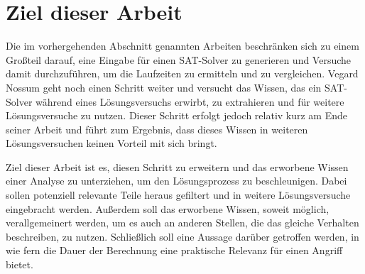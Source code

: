 \section{Ziel dieser Arbeit}
\label{sec:ziel}

Die im vorhergehenden Abschnitt genannten Arbeiten beschränken sich zu einem Großteil darauf, eine Eingabe für
einen SAT-Solver zu generieren und Versuche damit durchzuführen, um die Laufzeiten zu ermitteln und zu vergleichen.
Vegard Nossum geht noch einen Schritt weiter und versucht das Wissen, das ein SAT-Solver während eines Lösungsversuchs
erwirbt, zu extrahieren und für weitere Lösungsversuche zu nutzen. Dieser Schritt erfolgt jedoch relativ kurz am Ende
seiner Arbeit und führt zum Ergebnis, dass dieses Wissen in weiteren Lösungsversuchen keinen Vorteil mit sich bringt.

Ziel dieser Arbeit ist es, diesen Schritt zu erweitern und das erworbene Wissen einer Analyse zu unterziehen, um den
Lösungsprozess zu beschleunigen. Dabei sollen potenziell relevante Teile heraus gefiltert und in weitere Lösungsversuche
eingebracht werden. Außerdem soll das erworbene Wissen, soweit möglich, verallgemeinert werden, um es auch an anderen Stellen,
die das gleiche Verhalten beschreiben, zu nutzen. Schließlich soll eine Aussage darüber getroffen werden, in wie fern die Dauer
der Berechnung eine praktische Relevanz für einen Angriff bietet.